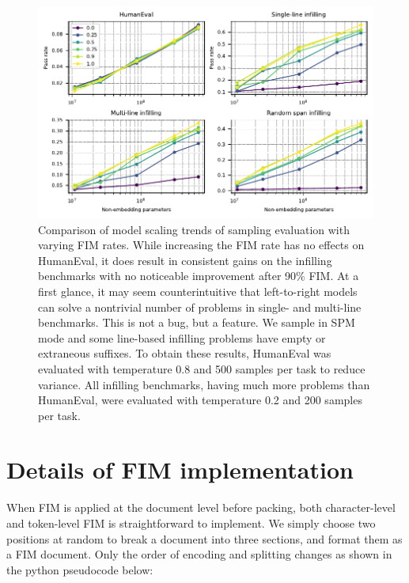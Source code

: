 \documentclass[postscript]{article}
\begin{document}
\begin{figure}[ht!]
\centering
\includegraphics[width=\textwidth]{figures/fim-rate-pass-rate-vs-compute.pdf}
\caption{Comparison of model scaling trends of sampling evaluation with varying FIM rates. While increasing the FIM rate has no effects on HumanEval, it does result in consistent gains on the infilling benchmarks with no noticeable improvement after 90\% FIM. 
At a first glance, it may seem counterintuitive that left-to-right models can solve a nontrivial number of problems in single- and multi-line benchmarks. This is not a bug, but a feature. We sample in SPM mode and some line-based infilling problems have empty or extraneous suffixes.
To obtain these results, HumanEval was evaluated with temperature 0.8 and 500 samples per task to reduce variance. All infilling benchmarks, having much more problems than HumanEval, were evaluated with temperature 0.2 and 200 samples per task.
}
\label{fig:fim-rate:pass-rate}
\end{figure}


\section{Details of FIM implementation}\label{appendix:impl_details}

When FIM is applied at the document level before packing, both character-level and token-level FIM is straightforward to implement. We simply choose two positions at random to break a document into three sections, and format them as a FIM document. Only the order of encoding and splitting changes as shown in the python pseudocode below:
\end{document}
